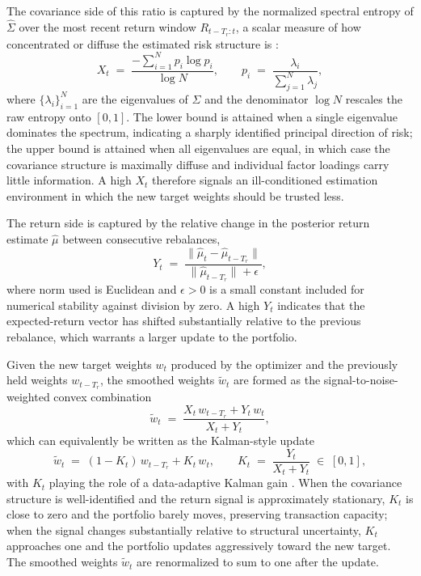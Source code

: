 \documentclass[12pt]{article}
\begin{document}
The covariance side of this ratio is captured by the normalized spectral entropy of $\hat{\Sigma}$ over the most recent return window $R_{t-T_r:t}$, a scalar measure of how concentrated or diffuse the estimated risk structure is \cite{meucci2009}:
\begin{equation}
  X_t \;=\; \frac{-\sum_{i=1}^{N} p_i \log p_i}{\log N}, \qquad
  p_i \;=\; \frac{\lambda_i}{\sum_{j=1}^{N} \lambda_j},
  \label{eq:kf-r}
\end{equation}
where $\{\lambda_i\}_{i=1}^{N}$ are the eigenvalues of $\hat{\Sigma}$ and the denominator $\log N$ rescales the raw entropy onto $[0,1]$. The lower bound is attained when a single eigenvalue dominates the spectrum, indicating a sharply identified principal direction of risk; the upper bound is attained when all eigenvalues are equal, in which case the covariance structure is maximally diffuse and individual factor loadings carry little information. A high $X_t$ therefore signals an ill-conditioned estimation environment in which the new target weights should be trusted less.

The return side is captured by the relative change in the posterior return estimate $\hat{\mu}$ between consecutive rebalances,
\begin{equation}
  Y_t \;=\; \frac{\|\hat{\mu}_{t} - \hat{\mu}_{t-T_r}\|_{}}{\|\hat{\mu}_{t-T_r}\|_{} + \epsilon},
  \label{eq:kf-q}
\end{equation}
where norm used is Euclidean and $\epsilon > 0$ is a small constant included for numerical stability against division by zero. A high $Y_t$ indicates that the expected-return vector has shifted substantially relative to the previous rebalance, which warrants a larger update to the portfolio.

Given the new target weights $w_t$ produced by the optimizer and the previously held weights $w_{t-T_r}$, the smoothed weights $\tilde{w}_t$ are formed as the signal-to-noise-weighted convex combination
\begin{equation}
  \tilde{w}_{t} \;=\; \frac{X_t\, w_{t-T_r} + Y_t\, w_t}{X_t + Y_t},
  \label{eq:kf-update}
\end{equation}
which can equivalently be written as the Kalman-style update
\begin{equation}
  \tilde{w}_t \;=\; (1 - K_t)\, w_{t-T_r} + K_t\, w_t, 
  \qquad K_t \;=\; \frac{Y_t}{X_t + Y_t} \;\in\; [0,1],
  \label{eq:kf-gain}
\end{equation}
with $K_t$ playing the role of a data-adaptive Kalman gain \cite{kalman1960}. When the covariance structure is well-identified and the return signal is approximately stationary, $K_t$ is close to zero and the portfolio barely moves, preserving transaction capacity; when the signal changes substantially relative to structural uncertainty, $K_t$ approaches one and the portfolio updates aggressively toward the new target. The smoothed weights $\tilde{w}_t$ are renormalized to sum to one after the update.
\end{document}
